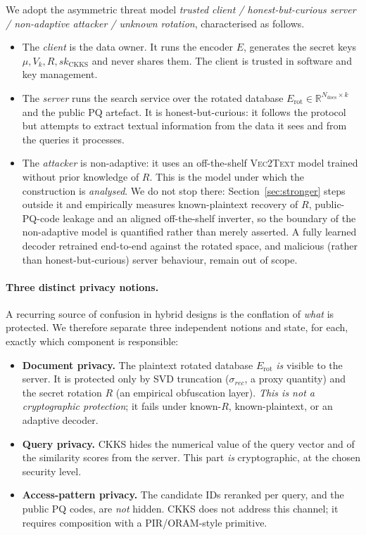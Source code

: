 \documentclass[11pt,a4paper]{article}
\begin{document}
We adopt the asymmetric threat model
\emph{trusted client / honest-but-curious server / non-adaptive
attacker / unknown rotation}, characterised as follows.

\begin{itemize}[leftmargin=18pt,topsep=4pt,itemsep=2pt]
\item The \emph{client} is the data owner. It runs the encoder $E$,
generates the secret keys $\mu, V_k, R, sk_{\mathrm{CKKS}}$ and never
shares them. The client is trusted in software and key management.
\item The \emph{server} runs the search service over the rotated database
$E_{\mathrm{rot}} \in \mathbb{R}^{N_{\mathrm{docs}} \times k}$ and the
public PQ artefact. It is honest-but-curious: it follows the protocol but
attempts to extract textual information from the data it sees and from the
queries it processes.
\item The \emph{attacker} is non-adaptive: it uses an off-the-shelf
\textsc{Vec2Text} model trained without prior knowledge of $R$. This is
the model under which the construction is \emph{analysed}. We do not stop
there: Section~\ref{sec:stronger} steps outside it and empirically
measures known-plaintext recovery of $R$, public-PQ-code leakage and an
aligned off-the-shelf inverter, so the boundary of the non-adaptive model
is quantified rather than merely asserted. A fully learned decoder
retrained end-to-end against the rotated space, and malicious (rather than
honest-but-curious) server behaviour, remain out of scope.
\end{itemize}

\paragraph{Three distinct privacy notions.} A recurring source of
confusion in hybrid designs is the conflation of \emph{what} is
protected. We therefore separate three independent notions and state,
for each, exactly which component is responsible:

\begin{itemize}[leftmargin=18pt,topsep=4pt,itemsep=2pt]
\item \textbf{Document privacy.} The plaintext rotated database
$E_{\mathrm{rot}}$ \emph{is} visible to the server. It is protected only
by SVD truncation ($\sigma_{rec}$, a proxy quantity) and the secret
rotation $R$ (an empirical obfuscation layer). \emph{This is not a
cryptographic protection}; it fails under known-$R$, known-plaintext,
or an adaptive decoder.
\item \textbf{Query privacy.} CKKS hides the numerical value of the
query vector and of the similarity scores from the server. This part
\emph{is} cryptographic, at the chosen security level.
\item \textbf{Access-pattern privacy.} The candidate IDs reranked per
query, and the public PQ codes, are \emph{not} hidden. CKKS does not
address this channel; it requires composition with a PIR/ORAM-style
primitive.
\end{itemize}
\end{document}
